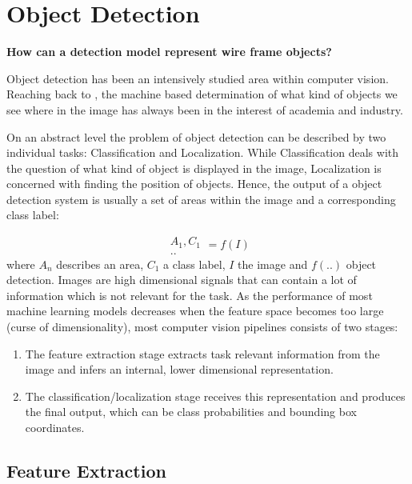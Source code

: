 	\chapter{Object Detection}
	
	\label{sec:object_detection}
	
	\begin{center}
		\textbf{ How can a detection model represent wire frame objects?}
	\end{center}
	
	
	Object detection has been an intensively studied area within computer vision. Reaching back to , the machine based determination of what kind of objects we see where in the image has always been in the interest of academia and industry.
	
	On an abstract level the problem of object detection can be described by two individual tasks: Classification and Localization. While Classification deals with the question of what kind of object is displayed in the image, Localization is concerned with finding the position of objects. Hence, the output of a object detection system is usually a set of areas within the image and a corresponding class label:
	
	$$
	\begin{matrix}
	A_1, C_1\\
	..
	\end{matrix} = f(I)
	$$
	where $A_n$ describes an area, $C_1$ a class label, $I$ the image and $f(..)$ object detection.
	Images are high dimensional signals that can contain a lot of information which is not relevant for the task. As the performance of most machine learning models decreases when the feature space becomes too large (curse of dimensionality), most computer vision pipelines consists of two stages:
	\begin{enumerate}
		\item The feature extraction stage extracts task relevant information from the image and infers an internal, lower dimensional representation.
		\item The classification/localization stage receives this representation and produces the final output, which can be class probabilities and bounding box coordinates.
	\end{enumerate}  

	\section{Feature Extraction}
	
